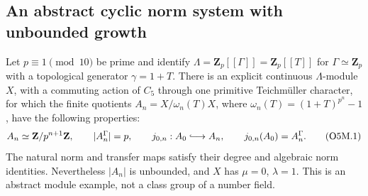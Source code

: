 \subsection{An abstract cyclic norm system with unbounded growth}

\begin{proposition}
Let $p\equiv1\pmod {10}$ be prime and identify
$\Lambda=\mathbf Z_p[[\Gamma]]=\mathbf Z_p[[T]]$ for
$\Gamma\simeq\mathbf Z_p$ with a topological generator $\gamma=1+T$.
There is an explicit continuous $\Lambda$-module $X$, with a commuting
action of $C_5$ through one primitive Teichm\"uller character, for which
the finite quotients $A_n=X/\omega_n(T)X$, where
$\omega_n(T)=(1+T)^{p^n}-1$, have the following properties:
\[
 A_n\simeq\mathbf Z/p^{n+1}\mathbf Z,\qquad
 |A_n^{\Gamma}|=p,\qquad
 j_{0,n}:A_0\lhook\joinrel\longrightarrow A_n,
 \qquad j_{0,n}(A_0)=A_n^{\Gamma}.                     \tag{O5M.1}
\]
The natural norm and transfer maps satisfy their degree and algebraic
norm identities.  Nevertheless $|A_n|$ is unbounded, and $X$ has
$\mu=0$, $\lambda=1$.
This is an abstract module example, not a class group of a number field.
\end{proposition}

